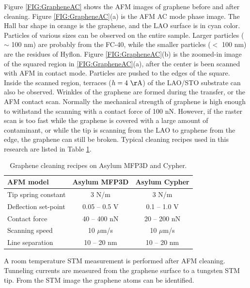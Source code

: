 \documentclass[pdflatex, sectionletters, 12pt]{pittetd}    %
\begin{document}
Figure \ref{FIG:GrapheneAC} shows the AFM images of graphene before and after cleaning. Figure \ref{FIG:GrapheneAC}(a) is the AFM AC mode phase image. The Hall bar shape in orange is the graphene, and the LAO surface is in cyan color. Particles of various sizes can be observed on the entire sample. Larger particles ($\sim$ 100 nm) are probably from the FC-40, while the smaller particles ($<$ 100 nm) are the residues of Hyflon. Figure \ref{FIG:GrapheneAC}(b) is the zoomed-in image of the squared region in \ref{FIG:GrapheneAC}(a), after the center is been scanned with AFM in contact mode. Particles are pushed to the edges of the square. Inside the scanned region, terraces ($h = 4 \ \mathrm{\AA}$) of the LAO/STO substrate can also be observed. Wrinkles of the graphene are formed during the transfer, or the AFM contact scan. Normally the mechanical strength of graphene is high enough\cite{lee2008measurement} to withstand the scanning with a contact force of 100 nN. However, if the raster scan is too fast while the graphene is covered with a large amount of contaminant, or while the tip is scanning from the LAO to graphene from the edge, the graphene can still be broken. Typical cleaning recipes used in this research are listed in Table \ref{TAB:AFMCleaning}.
\\

\begin{table}[h!]
	\centering
	\begin{tabular}{l|cc}
		\hline
		AFM model    &    Asylum MFP3D    &    Asylum Cypher \\ \hline
		Tip spring constant    &    3 N/m    & 3 N/m    \\ 
		Deflection set-point    &    0.05 -- 0.5 V    &    0.1 -- 1.0 V    \\        
		Contact force    &    40 -- 400 nN    &    20 -- 200 nN    \\
		Scanning speed    &    10 $\mu$m/s    &    10 $\mu$m/s \\ 
		Line separation    &    10 -- 20 nm    &    10 -- 20 nm    \\ \hline
	\end{tabular}
	\caption{Graphene cleaning recipes on Asylum MFP3D and Cypher.}
	\label{TAB:AFMCleaning}
	
\end{table}

A room temperature STM measurement is performed after AFM cleaning. Tunneling currents are measured from the graphene surface to a tungsten STM tip. From the STM image the graphene atoms can be identified.
\\
\end{document}
